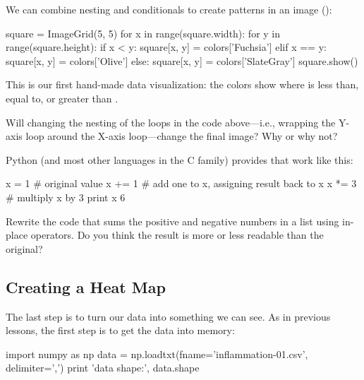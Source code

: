 
We can combine nesting and conditionals to create patterns in an image ():

\begin{VerbIn}
square = ImageGrid(5, 5)
for x in range(square.width):
    for y in range(square.height):
        if x < y:
            square[x, y] = colors['Fuchsia']
        elif x == y:
            square[x, y] = colors['Olive']
        else:
            square[x, y] = colors['SlateGray']
square.show()
\end{VerbIn}


This is our first hand-made data visualization: the colors show where
 is less than, equal to, or greater than .

\begin{challenge}
  Will changing the nesting of the loops in the code above---i.e.,
  wrapping the Y-axis loop around the X-axis loop---change the final
  image? Why or why not?
\end{challenge}

\begin{challenge}
  Python (and most other languages in the C family) provides
   that work like
  this:

\begin{VerbIn}
x = 1  # original value
x += 1 # add one to x, assigning result back to x
x *= 3 # multiply x by 3
print x
6
\end{VerbIn}

  Rewrite the code that sums the positive and negative numbers in a list
  using in-place operators. Do you think the result is more or less
  readable than the original?
\end{challenge}

\subsection{Creating a Heat Map}

The last step is to turn our data into something we can see. As in
previous lessons, the first step is to get the data into memory:

\begin{VerbIn}
import numpy as np
data = np.loadtxt(fname='inflammation-01.csv', delimiter=',')
print 'data shape:', data.shape
\end{VerbIn}

